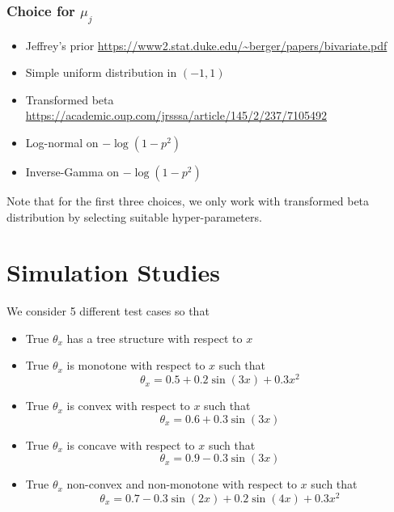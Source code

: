 \documentclass{amsart}
\begin{document}
\subsubsection{Choice for $\mu_j$}
\begin{itemize}
    \item Jeffrey's prior \url{https://www2.stat.duke.edu/~berger/papers/bivariate.pdf}
    \item Simple uniform distribution in $(-1,1)$ 
    \item Transformed beta \url{https://academic.oup.com/jrsssa/article/145/2/237/7105492}
    \item Log-normal on $-\log(1-p^2)$
    \item Inverse-Gamma on $-\log(1-p^2)$
\end{itemize}
Note that for the first three choices, we only work with transformed beta distribution by 
selecting suitable hyper-parameters.

\section{Simulation Studies}

We consider 5 different test cases so that
\begin{itemize}
    \item True $\theta_x$ has a tree structure with respect to $x$
    \item True $\theta_x$ is monotone with respect to $x$ such that 
    \begin{equation}
        \theta_x = 0.5 + 0.2 \sin(3x) + 0.3x^2
    \end{equation}
    \item True $\theta_x$ is convex with respect to $x$ such that 
    \begin{equation}
        \theta_x = 0.6 + 0.3 \sin(3x)
    \end{equation}
    \item True $\theta_x$ is concave with respect to $x$ such that 
    \begin{equation}
        \theta_x = 0.9 - 0.3 \sin(3x)
    \end{equation}
    \item True $\theta_x$ non-convex and non-monotone with respect to $x$ such that 
    \begin{equation}
        \theta_x = 0.7 - 0.3 \sin(2x) + 0.2 \sin(4x) + 0.3 x^2
    \end{equation}
\end{itemize}
\end{document}
